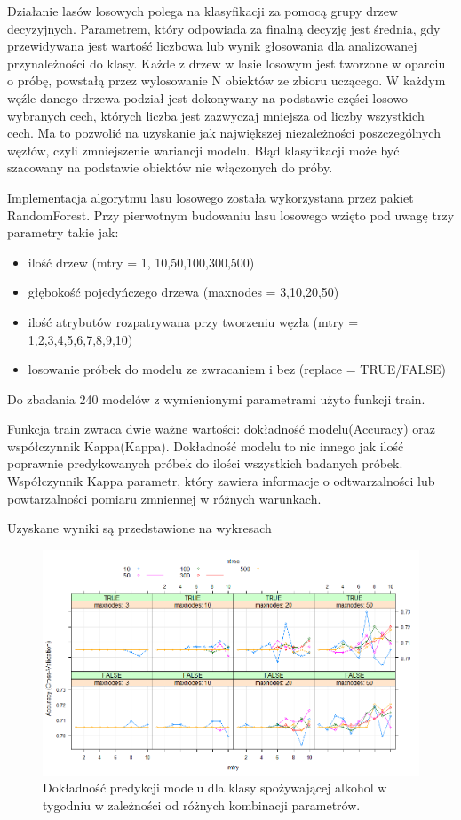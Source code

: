 Działanie lasów losowych polega na klasyfikacji za pomocą grupy drzew decyzyjnych. Parametrem, który odpowiada za finalną decyzję jest średnia, gdy przewidywana jest wartość liczbowa lub wynik głosowania dla analizowanej przynależności do klasy. Każde z drzew w lasie losowym jest tworzone w oparciu o próbę, powstałą przez wylosowanie N obiektów ze zbioru uczącego. W każdym węźle danego drzewa podział jest dokonywany na podstawie części losowo wybranych cech, których liczba jest zazwyczaj mniejsza od liczby wszystkich cech. Ma to pozwolić na uzyskanie jak największej niezależności poszczególnych węzłów, czyli zmniejszenie wariancji modelu.
Błąd klasyfikacji może być szacowany na podstawie obiektów nie włączonych do próby.

Implementacja algorytmu lasu losowego została wykorzystana przez pakiet RandomForest. Przy pierwotnym budowaniu lasu losowego wzięto pod uwagę trzy parametry takie jak:
\begin{itemize}
    \item ilość drzew (mtry = {1, 10,50,100,300,500})
    \item głębokość pojedyńczego drzewa (maxnodes = {3,10,20,50})
    \item ilość atrybutów rozpatrywana przy tworzeniu węzła (mtry = {1,2,3,4,5,6,7,8,9,10})
    \item losowanie próbek do modelu ze zwracaniem i bez (replace = {TRUE/FALSE})
\end{itemize}
Do zbadania 240 modelów z wymienionymi parametrami użyto funkcji train. 





Funkcja train zwraca dwie ważne wartości: dokładność modelu(Accuracy) oraz współczynnik Kappa(Kappa). Dokładność modelu to nic innego jak ilość poprawnie predykowanych próbek do ilości wszystkich badanych próbek. Współczynnik Kappa parametr, który zawiera informacje o odtwarzalności lub powtarzalności pomiaru zmniennej w różnych warunkach. 


Uzyskane wyniki są przedstawione na wykresach

\begin{figure}[h]
 \centering 
 \includegraphics[scale=0.60]{tex/customD_vol4.png}
 \caption{Dokładność predykcji modelu dla klasy spożywającej alkohol w tygodniu w zależności od różnych kombinacji parametrów.}
 \label{fig:classes}
\end{figure}

